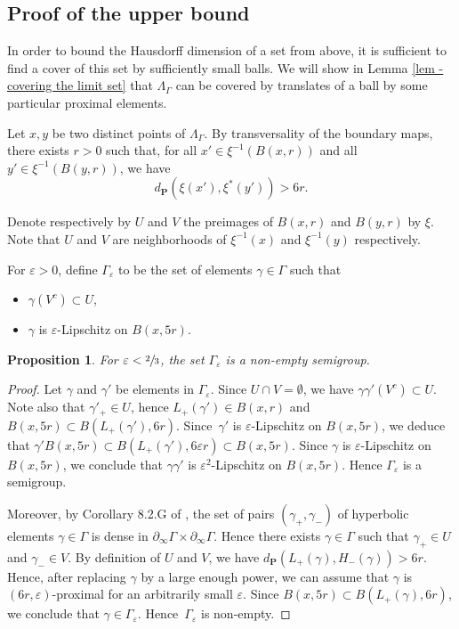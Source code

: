 \documentclass[JEP,XML,SOM,Unicode,NoEqCountersInSection,NoFloatCountersInSection,published]{cedram}
\newtheorem{prop}[theo]{Proposition}
\theoremstyle{definition}
\newcommand{\proj}{\mathbf{P}}
\let\epsilon\varepsilon
\let\G\Gamma
\let\g\gamma
\begin{document}
\subsection{Proof of the upper bound}
In order to bound the Hausdorff dimension of a set from above, it is sufficient to find a cover of this set by sufficiently small balls. We will show in Lemma \ref{lem - covering the limit set} that $\Lambda_\Gamma$ can be covered by translates of a ball by some particular proximal elements.

Let $x,y$ be two distinct points of $\Lambda_\Gamma$. By transversality of the boundary maps, there exists $r>0$ such that, for all $x'\in \xi^{-1}(B(x,r))$ and all $y' \in \xi^{-1}(B(y,r))$, we have
\[d_\proj(\xi(x'), \xi^*(y')) > 6r.\]

Denote respectively by $U$ and $V$ the preimages of $B(x,r)$ and $B(y,r)$ by $\xi$. Note that $U$ and $V$ are neighborhoods of $\xi^{-1}(x)$ and $\xi^{-1}(y)$ respectively.

For $\epsilon>0$, define $\G_\epsilon$ to be the set of elements $\g\in \G$ such that
\begin{itemize}
\item $\g(V^c)\subset U$,
\item $\g$ is $\epsilon$-Lipschitz on $B(x, 5r)$.
\end{itemize}

\begin{prop}
For $\epsilon < \sfrac{2}{3}$, the set $\Gamma_\epsilon$ is a non-empty semigroup.
\end{prop}

\begin{proof}
Let $\gamma$ and $\gamma'$ be elements in $\G_\epsilon$. Since $U\cap V = \emptyset$, we have $\gamma\gamma'(V^c) \subset U$.
Note also that $\gamma'_+ \in U$, hence $L_+(\gamma')\in B(x,r)$ and $B(x,5r) \subset B(L_+(\gamma'),6r)$. Since~$\gamma'$ is $\epsilon$-Lipschitz on $B(x,5r)$, we deduce that $\gamma' B(x,5r) \subset B(L_+(\gamma'), 6\epsilon r) \subset B(x,5r)$. Since $\gamma$ is $\epsilon$-Lipschitz on $B(x,5r)$, we conclude that $\gamma \gamma'$ is $\epsilon^2$-Lipschitz on $B(x, 5r)$. Hence $\Gamma_\epsilon$ is a semigroup.

Moreover, by Corollary 8.2.G of \cite{Gromov}, the set of pairs $(\g_+,\g_-)$ of hyperbolic elements $\g\in\G$ is dense in $\partial_\infty \G\times\partial_\infty\G$. Hence there exists $\gamma \in \Gamma$ such that $\gamma_+ \in U$ and $\gamma_-\in V$. By definition of $U$ and $V$, we have $d_\proj(L_+(\gamma),H_-(\gamma)) > 6r$. Hence, after replacing $\gamma$ by a large enough power, we can assume that $\gamma$ is $(6r,\epsilon)$-proximal for an arbitrarily small $\epsilon$. Since $B(x,5r)\subset B(L_+(\gamma), 6r)$, we conclude that $\gamma \in \Gamma_\epsilon$. Hence~$\Gamma_\epsilon$ is non-empty.
\end{proof}
\end{document}
